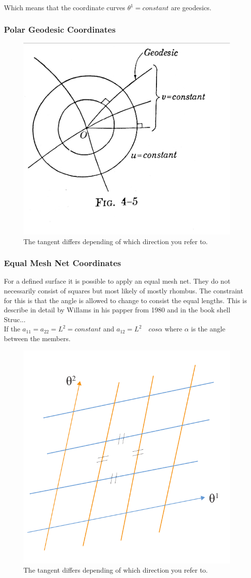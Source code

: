Which means that the coordinate curves $\theta^1 = constant$ are geodesics. 


\subsubsection{Polar Geodesic Coordinates}

\begin{figure}[H]
\centering
\includegraphics[height=0.5\linewidth ]{figure/Theory/polarGeodesicCoordMod.pdf}
\caption{The tangent differs depending of which direction you refer to. }
\end{figure}


\subsubsection{Equal Mesh Net Coordinates}

For a defined surface it is possible to apply an equal mesh net. They do not necessarily consist of squares but most likely of mostly rhombus. The constraint for this is that the angle is allowed to change to consist the equal lengths. This is describe in detail by Willams in his papper from 1980 and in the book shell Struc...\\
If the $a_{11} = a_{22} = L^2 = constant$ and $a_{12} = L^2\quad cos\alpha$ where $\alpha$ is the angle between the members.\\

\begin{figure}[H]
\centering
\includegraphics[width=0.6\linewidth ]{figure/Theory/equalMeshFrei.pdf}
\caption{The tangent differs depending of which direction you refer to. }
\end{figure}

